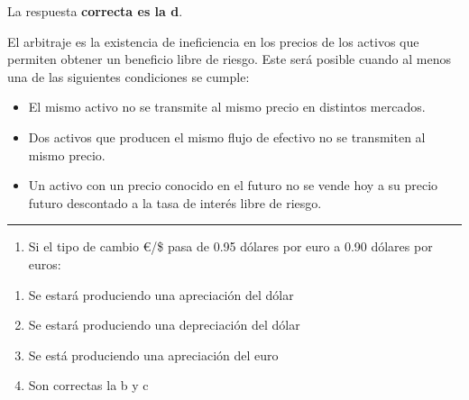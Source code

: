 \documentclass[
  letterpaper,
  DIV=11,
  numbers=noendperiod]{scrreprt}
\providecommand{\tightlist}{%
  \setlength{\itemsep}{0pt}\setlength{\parskip}{0pt}}\usepackage{longtable,booktabs,array}
\begin{document}
\begin{tcolorbox}[enhanced jigsaw, left=2mm, opacityback=0, colback=white, breakable, arc=.35mm, bottomrule=.15mm, rightrule=.15mm, toprule=.15mm, leftrule=.75mm, colframe=quarto-callout-tip-color-frame]
\begin{minipage}[t]{5.5mm}
\textcolor{quarto-callout-tip-color}{\faLightbulb}
\end{minipage}%
\begin{minipage}[t]{\textwidth - 5.5mm}

La respuesta \textbf{correcta es la d}.

El arbitraje es la existencia de ineficiencia en los precios de los
activos que permiten obtener un beneficio libre de riesgo. Este será
posible cuando al menos una de las siguientes condiciones se cumple:

\begin{itemize}
\item
  El mismo activo no se transmite al mismo precio en distintos mercados.
\item
  Dos activos que producen el mismo flujo de efectivo no se transmiten
  al mismo precio.
\item
  Un activo con un precio conocido en el futuro no se vende hoy a su
  precio futuro descontado a la tasa de interés libre de riesgo.
\end{itemize}

\end{minipage}%
\end{tcolorbox}

\begin{center}\rule{0.5\linewidth}{0.5pt}\end{center}

\begin{enumerate}
\def\labelenumi{\arabic{enumi}.}
\setcounter{enumi}{12}
\tightlist
\item
  Si el tipo de cambio €/\$ pasa de 0.95 dólares por euro a 0.90 dólares
  por euros:
\end{enumerate}

\begin{enumerate}
\def\labelenumi{\alph{enumi})}
\item
  Se estará produciendo una apreciación del dólar
\item
  Se estará produciendo una depreciación del dólar
\item
  Se está produciendo una apreciación del euro
\item
  Son correctas la b y c
\end{enumerate}
\end{document}
